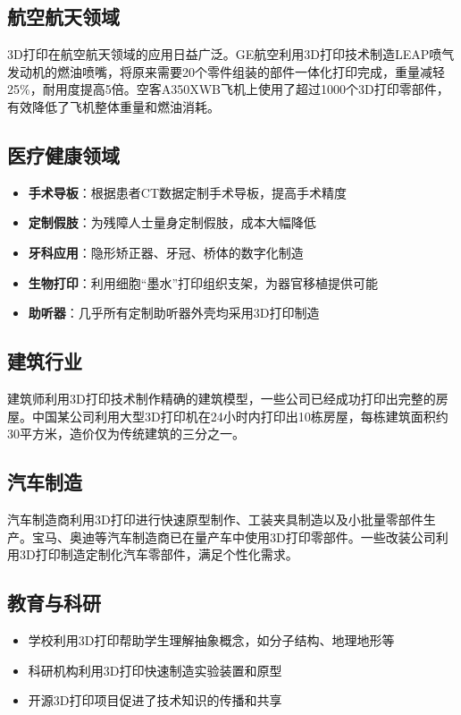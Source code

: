 \documentclass[12pt,UTF8]{ctexbook}
\begin{document}
\subsection{航空航天领域}
3D打印在航空航天领域的应用日益广泛。GE航空利用3D打印技术制造LEAP喷气发动机的燃油喷嘴，将原来需要20个零件组装的部件一体化打印完成，重量减轻25\%，耐用度提高5倍。空客A350XWB飞机上使用了超过1000个3D打印零部件，有效降低了飞机整体重量和燃油消耗。

\subsection{医疗健康领域}
\begin{itemize}
\item \textbf{手术导板}：根据患者CT数据定制手术导板，提高手术精度
\item \textbf{定制假肢}：为残障人士量身定制假肢，成本大幅降低
\item \textbf{牙科应用}：隐形矫正器、牙冠、桥体的数字化制造
\item \textbf{生物打印}：利用细胞“墨水”打印组织支架，为器官移植提供可能
\item \textbf{助听器}：几乎所有定制助听器外壳均采用3D打印制造
\end{itemize}

\subsection{建筑行业}
建筑师利用3D打印技术制作精确的建筑模型，一些公司已经成功打印出完整的房屋。中国某公司利用大型3D打印机在24小时内打印出10栋房屋，每栋建筑面积约30平方米，造价仅为传统建筑的三分之一。

\subsection{汽车制造}
汽车制造商利用3D打印进行快速原型制作、工装夹具制造以及小批量零部件生产。宝马、奥迪等汽车制造商已在量产车中使用3D打印零部件。一些改装公司利用3D打印制造定制化汽车零部件，满足个性化需求。

\subsection{教育与科研}
\begin{itemize}
\item 学校利用3D打印帮助学生理解抽象概念，如分子结构、地理地形等
\item 科研机构利用3D打印快速制造实验装置和原型
\item 开源3D打印项目促进了技术知识的传播和共享
\end{itemize}
\end{document}
